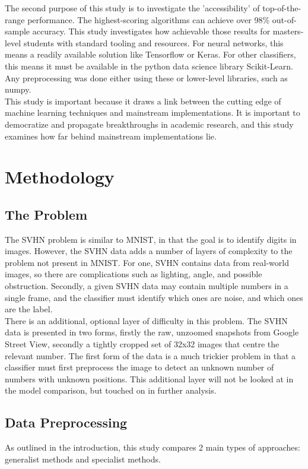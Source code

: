 \documentclass[11pt]{article}
\begin{document}
The second purpose of this study is to investigate the 'accessibility' of top-of-the-range performance. The highest-scoring algorithms can achieve over 98\% out-of-sample accuracy. This study investigates how achievable those results for masters-level students with standard tooling and resources. For neural networks, this means a readily available solution like Tensorflow or Keras. For other classifiers, this means it must be available in the python data science library Scikit-Learn. Any preprocessing was done either using these or lower-level libraries, such as numpy.\\

This study is important because it draws a link between the cutting edge of machine learning techniques and mainstream implementations. It is important to democratize and propagate breakthroughs in academic research, and this study examines how far behind mainstream implementations lie.

\section{Methodology}

\subsection{The Problem}
The SVHN problem is similar to MNIST, in that the goal is to identify digits in images. However, the SVHN data adds a number of layers of complexity to the problem not present in MNIST. For one, SVHN contains data from real-world images, so there are complications such as lighting, angle, and possible obstruction. Secondly, a given SVHN data may contain multiple numbers in a single frame, and the classifier must identify which ones are noise, and which ones are the label.\\

There is an additional, optional layer of difficulty in this problem. The SVHN data is presented in two forms, firstly the raw, unzoomed snapshots from Google Street View, secondly a tightly cropped set of 32x32 images that centre the relevant number. The first form of the data is a much trickier problem in that a classifier must first preprocess the image to detect an unknown number of numbers with unknown positions. This additional layer will not be looked at in the model comparison, but touched on in further analysis.

\subsection{Data Preprocessing}
As outlined in the introduction, this study compares 2 main types of approaches: generalist methods and specialist methods.\\
\end{document}
